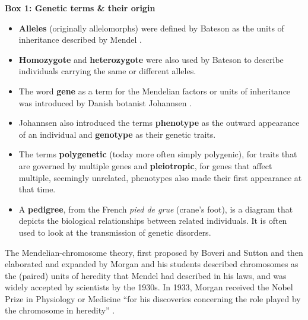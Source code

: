 \begin{Comment}
\hspace{-2.5mm}\textbf{Box 1: Genetic terms \& their origin}\label{box:genetic_terms}
\small
\begin{itemize}
    \item \textbf{Alleles} (originally allelomorphs) were defined by Bateson as the units of inheritance described by Mendel \cite{bateson2013mendel}.
    \item \textbf{Homozygote} and \textbf{heterozygote} were also used by Bateson to describe individuals carrying the same or different alleles.
    \item The word \textbf{gene} as a term for the Mendelian factors or units of inheritance was introduced by Danish botanist Johannsen \cite{johannsen1911genotype}. 
    \item Johannsen also introduced the terms \textbf{phenotype} as the outward appearance of an individual and \textbf{genotype} as their genetic traits. 
    \item The terms \textbf{polygenetic} (today more often simply polygenic), for traits that are governed by multiple genes 
    and \textbf{pleiotropic}, for genes that affect multiple, seemingly unrelated, phenotypes 
    also made their first appearance at that time. 
    \item A \textbf{pedigree}, from the French \textit{pied de grue} (crane's foot), is a diagram that depicts the biological relationships between related individuals.
    It is often used to look at the transmission of genetic disorders.
\end{itemize}
\vspace{3mm}
\end{Comment}

\vspace{3mm}

The Mendelian-chromosome theory, first proposed by Boveri and Sutton \cite{sutton1903chromosomes} and then elaborated and expanded by Morgan and his students \cite{morgan1915mechanism} described chromosomes as the (paired) units of heredity that Mendel had described in his laws, and was widely accepted by scientists by the 1930s. 
In 1933, Morgan received the Nobel Prize in Physiology or Medicine “for his discoveries concerning the role played by the chromosome in heredity” \cite{nobel1933nobel}.\\

